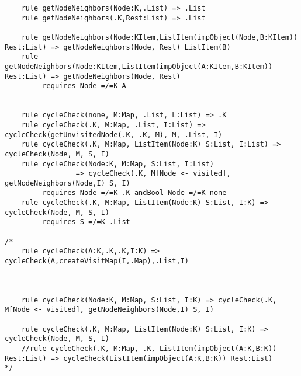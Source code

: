 \begin{lstlisting}
    rule getNodeNeighbors(Node:K,.List) => .List
    rule getNodeNeighbors(.K,Rest:List) => .List

    rule getNodeNeighbors(Node:KItem,ListItem(impObject(Node,B:KItem)) Rest:List) => getNodeNeighbors(Node, Rest) ListItem(B)
    rule getNodeNeighbors(Node:KItem,ListItem(impObject(A:KItem,B:KItem)) Rest:List) => getNodeNeighbors(Node, Rest)
         requires Node =/=K A


    rule cycleCheck(none, M:Map, .List, L:List) => .K
    rule cycleCheck(.K, M:Map, .List, I:List) => cycleCheck(getUnvisitedNode(.K, .K, M), M, .List, I)
    rule cycleCheck(.K, M:Map, ListItem(Node:K) S:List, I:List) => cycleCheck(Node, M, S, I)
    rule cycleCheck(Node:K, M:Map, S:List, I:List)
                 => cycleCheck(.K, M[Node <- visited], getNodeNeighbors(Node,I) S, I)
         requires Node =/=K .K andBool Node =/=K none
    rule cycleCheck(.K, M:Map, ListItem(Node:K) S:List, I:K) => cycleCheck(Node, M, S, I)
         requires S =/=K .List

/*
    rule cycleCheck(A:K,.K,.K,I:K) => cycleCheck(A,createVisitMap(I,.Map),.List,I)



    rule cycleCheck(Node:K, M:Map, S:List, I:K) => cycleCheck(.K, M[Node <- visited], getNodeNeighbors(Node,I) S, I)

    rule cycleCheck(.K, M:Map, ListItem(Node:K) S:List, I:K) => cycleCheck(Node, M, S, I)
    //rule cycleCheck(.K, M:Map, .K, ListItem(impObject(A:K,B:K)) Rest:List) => cycleCheck(ListItem(impObject(A:K,B:K)) Rest:List)
*/
\end{lstlisting}

